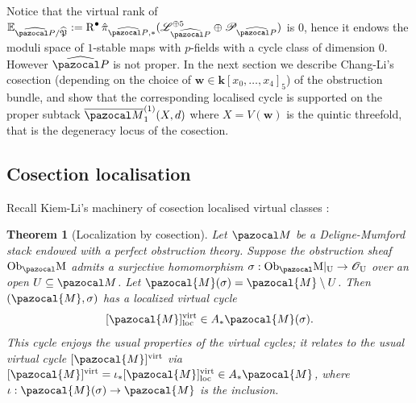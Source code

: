 \documentclass[11pt]{amsart}
\newcommand{\Mone}[3]{\overline{\pazocal M}^{(1)}_{#1}(#2,#3)}
\renewcommand{\k}{\mathbf k}
\newcommand{\OO}{\mathcal O}
\renewcommand{\to}{\rightarrow}
\newcommand{\hP}{\widehat{\mathfrak P}}
\newcommand{\R}{\operatorname{R}}
\newcommand{\w}{\mathbf{w}}
\theoremstyle{plain}
\newtheorem*{teo*}{Theorem}
\theoremstyle{definition}
\begin{document}
\smallskip

Notice that the virtual rank of $\mathbb E_{\widehat{\pazocal P}/\hP}:=\R^\bullet\hat\pi_{\widehat{\pazocal P},*}(\mathcal L_{\widehat{\pazocal P}}^{\oplus 5}\oplus\mathcal P_{\widehat{\pazocal P}})$ is $0$, hence it endows the moduli space of $1$-stable maps with $p$-fields with a cycle class of dimension $0$. However $\widehat{\pazocal P}$ is not proper. In the next section we describe Chang-Li's cosection (depending on the choice of $\w\in\k[x_0,\ldots,x_4]_5$) of the obstruction bundle, and show that the corresponding localised cycle is supported on the proper subtack $\Mone{1}{X}{d}$ where $X=V(\w)$ is the quintic threefold, that is the degeneracy locus of the cosection.



\subsection{Cosection localisation}
Recall Kiem-Li's machinery of cosection localised virtual classes \cite[Theorem 1.1]{KLcosection}:

\begin{teo*}[Localization by cosection]\label{thm:KLlocalisation}
Let $\pazocal M$ be a Deligne-Mumford stack endowed with a perfect
obstruction theory. Suppose the obstruction sheaf $\rm{Ob}_\pazocal M$ admits a
surjective homomorphism $\sigma:\rm{Ob}_\pazocal M|_U  \to \OO_U$
over an open $U\subseteq \pazocal M$.
Let $\pazocal{M}(\sigma)=\pazocal{M}\setminus U$.
Then $(\pazocal{M},\sigma)$ has a localized virtual cycle
$$[\pazocal{M}]^{\rm{virt}}_{\rm{loc}}\in A_* \pazocal{M}(\sigma).$$
This cycle enjoys the usual properties of the virtual cycles; it relates to
the usual virtual cycle $[\pazocal{M}]^{\rm{virt}}$ via 
$[\pazocal{M}]^{\rm{virt}} = \iota_*[\pazocal{M}]^{\rm{virt}}_{\rm{loc}} \in A_*  \pazocal{M}$, where
$\iota: \pazocal{M}(\sigma)\to \pazocal{M}$ is the inclusion.
\end{teo*}
\end{document}
